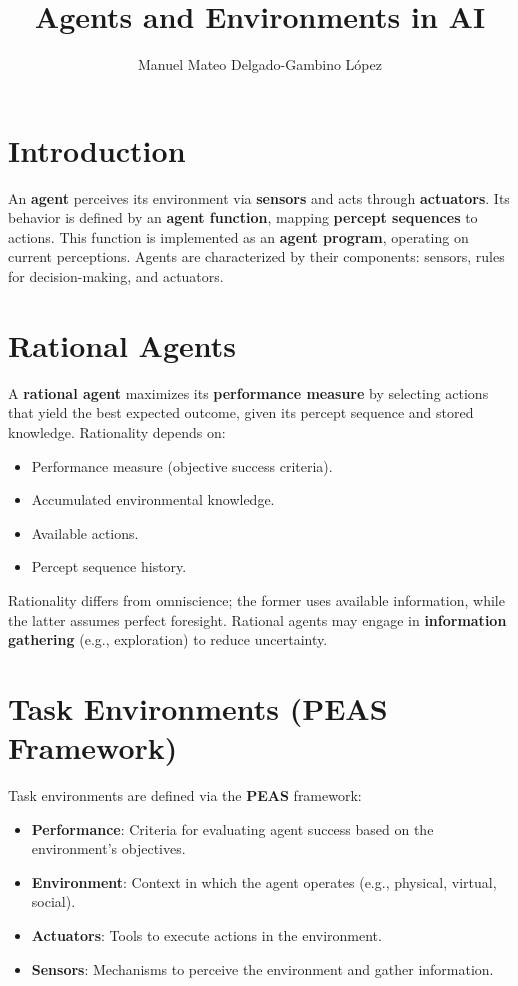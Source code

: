 \documentclass[conference]{IEEEtran}
\begin{document}
\title{Agents and Environments in AI}
\author{Manuel Mateo Delgado-Gambino López}
\maketitle

\section{Introduction}
An \textbf{agent} perceives its environment via \textbf{sensors} and acts through \textbf{actuators}. Its behavior is defined by an \textbf{agent function}, mapping \textbf{percept sequences} to actions. This function is implemented as an \textbf{agent program}, operating on current perceptions. Agents are characterized by their components: sensors, rules for decision-making, and actuators.

\section{Rational Agents}
A \textbf{rational agent} maximizes its \textbf{performance measure} by selecting actions that yield the best expected outcome, given its percept sequence and stored knowledge. Rationality depends on:
\begin{itemize}
    \item Performance measure (objective success criteria).
    \item Accumulated environmental knowledge.
    \item Available actions.
    \item Percept sequence history.
\end{itemize}
Rationality differs from omniscience; the former uses available information, while the latter assumes perfect foresight. Rational agents may engage in \textbf{information gathering} (e.g., exploration) to reduce uncertainty.

\section{Task Environments (PEAS Framework)}
Task environments are defined via the \textbf{PEAS} framework:
\begin{itemize}
    \item \textbf{Performance}: Criteria for evaluating agent success based on the environment's objectives.
    \item \textbf{Environment}: Context in which the agent operates (e.g., physical, virtual, social).
    \item \textbf{Actuators}: Tools to execute actions in the environment.
    \item \textbf{Sensors}: Mechanisms to perceive the environment and gather information.
\end{itemize}
\end{document}
